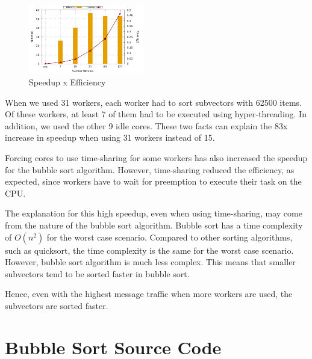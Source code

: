 \documentclass[10pt,twocolumn]{article}
\begin{document}
\begin{figure}[ht]
	\centering
	\includegraphics[width=0.45\textwidth]{../logs/scripts/bubble-sort-speedup-efficiency.pdf}
	\caption{Speedup x Efficiency}
	\label{fig:bubble-sort-speedup-efficiency}
\end{figure}

When we used 31 workers, each worker had to sort subvectors with 62500 items. Of these workers, at least 7 of them had to be executed using hyper-threading. In addition, we used the other 9 idle cores. These two facts can explain the 83x increase in speedup when using 31 workers instead of 15.

Forcing cores to use time-sharing for some workers has also increased the speedup for the bubble sort algorithm. However, time-sharing reduced the efficiency, as expected, since workers have to wait for preemption to execute their task on the CPU.

The explanation for this high speedup, even when using time-sharing, may come from the nature of the bubble sort algorithm. Bubble sort has a time complexity of $O(n^2)$ for the worst case scenario. Compared to other sorting algorithms, such as quicksort, the time complexity is the same for the worst case scenario. However, bubble sort algorithm is much less complex. This means that smaller subvectors tend to be sorted faster in bubble sort.

Hence, even with the highest message traffic when more workers are used, the subvectors are sorted faster.

\onecolumn

\section*{Bubble Sort Source Code}



\end{document}
